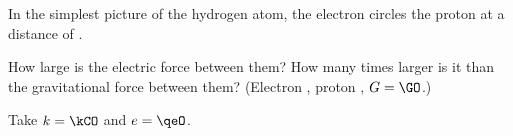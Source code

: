 In the simplest picture of the hydrogen atom, the electron circles the proton at a distance of \rHO.

\begin{abcliste}
\abc How large is the electric force between them?
\abc How many times larger is it than the gravitational force between them? (Electron \meO, proton \mprO, $G = \GO$.)
\end{abcliste}

Take $k = \kCO$ and $e = \qeO$.

